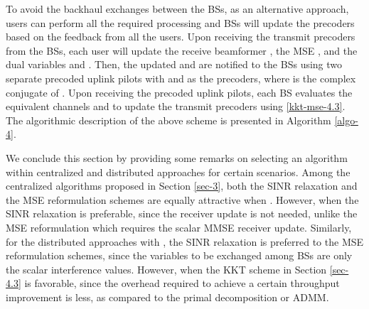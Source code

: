 To avoid the backhaul exchanges between the \acp{BS}, as an alternative approach, users can perform all the required processing and \acp{BS} will update the precoders based on the feedback from all the users. Upon receiving the transmit precoders from the \acp{BS}, each user will update the receive beamformer , the \ac{MSE} , and the dual variables  and . Then, the updated  and  are notified to the \acp{BS} using two separate precoded uplink pilots with  and  as the precoders, where  is the complex conjugate of . Upon receiving the precoded uplink pilots, each \ac{BS} evaluates the equivalent channels  and  to update the transmit precoders using \eqref{kkt-mse-4.3}. The algorithmic description of the above scheme is presented in Algorithm \ref{algo-4}.


We conclude this section by providing some remarks on selecting an algorithm within centralized and distributed approaches for certain scenarios. Among the centralized algorithms proposed in Section \ref{sec-3}, both the \ac{SINR} relaxation and the \ac{MSE} reformulation schemes are equally attractive when . However, when  the \ac{SINR} relaxation is preferable, since the receiver update is not needed, unlike the \ac{MSE} reformulation which requires the scalar \ac{MMSE} receiver update. Similarly, for the distributed approaches with , the \ac{SINR} relaxation is preferred to the \ac{MSE} reformulation schemes, since the variables to be exchanged among \acp{BS} are only the scalar interference values. However, when  the \ac{KKT} scheme in Section \ref{sec-4.3} is favorable, since the overhead required to achieve a certain throughput improvement is less, as compared to the primal decomposition or \ac{ADMM}.

